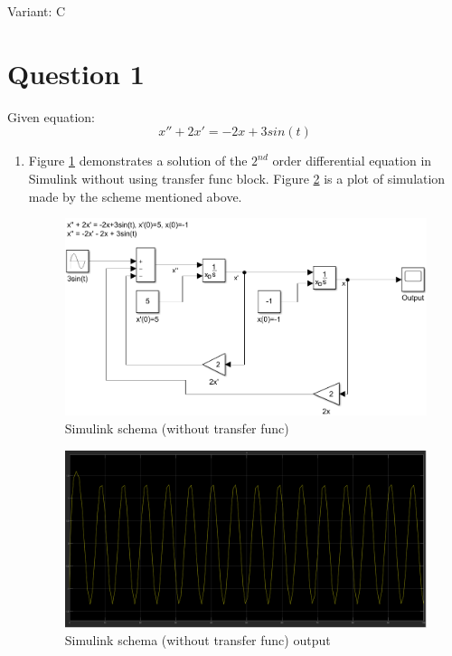 \documentclass[12pt,letterpaper]{article}
\begin{document}
Variant: C
\section*{Question 1}
\label{Q:1}
Given equation:
\begin{equation*}
    x'' + 2x' = -2x+3sin(t)
\end{equation*}
\begin{enumerate}[leftmargin=!,labelindent=5pt]
    \item Figure \ref{fig:1} demonstrates a solution of the $2^{nd}$ order differential equation in Simulink without using transfer func block. Figure \ref{fig:1_out} is a plot of simulation made by the scheme mentioned above.
        \begin{figure}[H]
            \centering
            \includegraphics[width=15cm]{images/schemas/ex1_scheme.png}
            \caption{Simulink schema (without transfer func)}
            \label{fig:1}
        \end{figure}
        \begin{figure}[H]
            \centering
            \includegraphics[width=15cm]{images/output/ex1_out.png}
            \caption{Simulink schema (without transfer func) output}
            \label{fig:1_out}
        \end{figure}
        

\end{enumerate}
\end{document}
